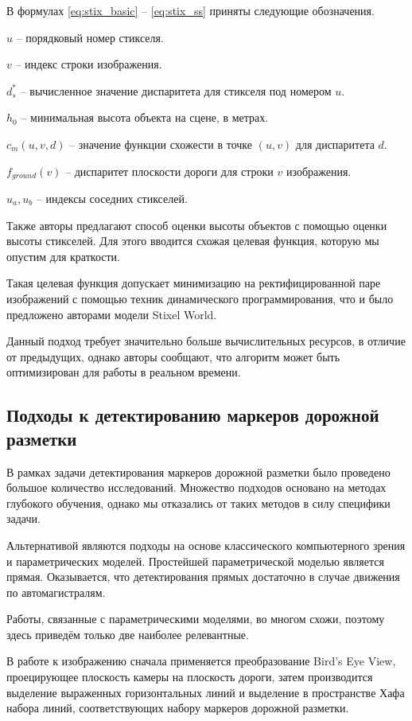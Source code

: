 \documentclass[aps,%
14pt,%
final,%
oneside,
onecolumn,%
musixtex, %
superscriptaddress,%
centertags]{extarticle} %
\begin{document}
В формулах \ref{eq:stix_basic} -- \ref{eq:stix_ss} приняты следующие обозначения.

$u$ -- порядковый номер стикселя.

$v$ -- индекс строки изображения.

$d^*_s$ -- вычисленное значение диспаритета для стикселя под номером $u$.

$h_0$ -- минимальная высота объекта на сцене, в метрах.

$c_m(u, v, d)$ -- значение функции схожести в точке $(u, v)$ для диспаритета $d$.

$f_{ground}(v)$ -- диспаритет плоскости дороги для строки $v$ изображения.

$u_a, u_b$ -- индексы соседних стикселей.

Также авторы предлагают способ оценки высоты объектов с помощью оценки высоты стикселей. Для этого вводится схожая целевая функция, которую мы опустим для краткости.

Такая целевая функция допускает минимизацию на ректифицированной паре изображений с помощью техник динамического программирования, что и было предложено авторами модели Stixel World.

Данный подход требует значительно больше вычислительных ресурсов, в отличие от предыдущих, однако авторы \cite{benenson2011stixels} сообщают, что алгоритм может быть оптимизирован для работы в реальном времени.


\subsection{Подходы к детектированию маркеров дорожной разметки}

В рамках задачи детектирования маркеров дорожной разметки было проведено большое количество исследований\cite{hillel2014recent}. Множество подходов основано на методах глубокого обучения, однако мы отказались от таких методов в силу специфики задачи.

Альтернативой являются подходы на основе классического компьютерного зрения и параметрических моделей. Простейшей параметрической моделью является прямая. Оказывается, что детектирования прямых достаточно в случае движения по автомагистралям\cite{hillel2014recent}.

Работы, связанные с параметрическими моделями, во многом схожи, поэтому здесь приведём только две наиболее релевантные. 

В работе \cite{song2017real} к изображению сначала применяется преобразование Bird's Eye View, проецирующее плоскость камеры на плоскость дороги, затем производится выделение выраженных горизонтальных линий и выделение в пространстве Хафа набора линий, соответствующих набору маркеров дорожной разметки.
\end{document}
